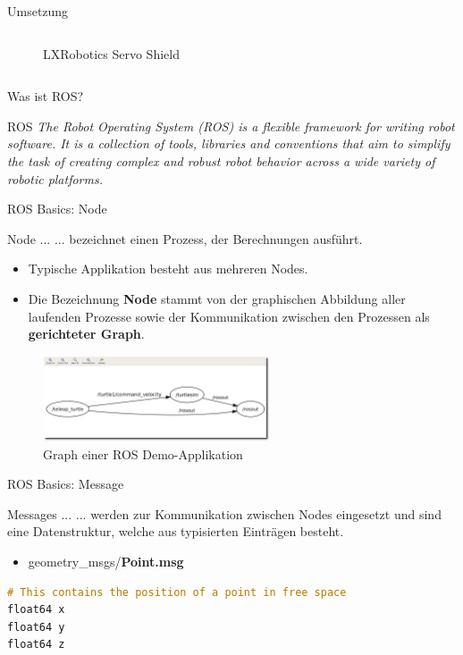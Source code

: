 \documentclass{beamer}
\begin{document}
\begin{frame}{Umsetzung}
\begin{columns}
\begin{column}{0.3\textwidth}
\begin{figure}[H]
			\caption{LXRobotics Servo Shield}
		\end{figure}
	\end{column}
\end{columns}
\end{frame}
\begin{frame}{Was ist ROS?}
\begin{alertblock}{ROS}
\textit{The Robot Operating System (ROS) is a flexible framework for writing robot software. It is a collection of tools, libraries and conventions that aim to simplify the task of creating complex and robust robot behavior across a wide variety of robotic platforms.}
\end{alertblock}
\end{frame}
\begin{frame}{ROS Basics: Node}
\begin{alertblock}{Node ...}
... bezeichnet einen Prozess, der Berechnungen ausf\"uhrt.
\end{alertblock}
\begin{itemize}
	\item Typische Applikation besteht aus mehreren Nodes.
	\item Die Bezeichnung \textbf{Node} stammt von der graphischen Abbildung aller laufenden Prozesse sowie der Kommunikation zwischen den Prozessen als \textbf{gerichteter Graph}.
\end{itemize}
\begin{figure}[H]
	\centering
	\includegraphics[width=0.6\textwidth]{./images/rxgraph-turtle-key.png}
	\caption{Graph einer ROS Demo-Applikation\cite{ROS:2015:Online}}
	\label{fig:ros_graph}
\end{figure}
\end{frame}
\begin{frame}[fragile]{ROS Basics: Message}
\begin{alertblock}{Messages ...}
... werden zur Kommunikation zwischen Nodes eingesetzt und sind eine Datenstruktur, welche aus typisierten Eintr\"agen besteht.
\end{alertblock}
\vspace{20px}
\begin{itemize}
	\item geometry\_msgs/\textbf{Point.msg}
\end{itemize}
\begin{lstlisting}[frame=single, language=C]
# This contains the position of a point in free space
float64 x
float64 y
float64 z
\end{lstlisting}
\end{frame}
\end{document}
